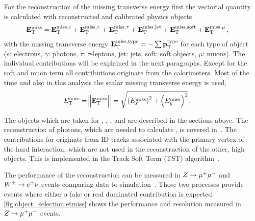 For the reconstruction of the missing transverse energy first the vectorial quantity \etmissvec{} is calculated
with reconstructed and calibrated physics objects~\cite{ATL-PHYS-PUB-2015-023}
\begin{equation}
    \label{eq:met:vector}
    \mathbf{E}_\text{T}^\text{miss} = \mathbf{E}_\text{T}^{\text{miss},e} + \mathbf{E}_\text{T}^{\text{miss},\gamma} + \mathbf{E}_\text{T}^{\text{miss},\tau} + \mathbf{E}_\text{T}^{\text{miss},\text{jet}} + \mathbf{E}_\text{T}^{\text{miss},\text{soft}} + \mathbf{E}_\text{T}^{\text{miss},\mu} \,,
\end{equation}
with the missing transverse energy $\mathbf{E}_\text{T}^{\text{miss},\text{type}} = - \sum \mathbf{p}_\text{T}^\text{type}$ for each type of object
($e$: electrons, $\gamma$: photons, $\tau$: $\tau$-leptons, jet: jets, soft: soft objects, $\mu$: muons).
The individual contributions will be explained in the next paragraphs.
Except for the soft and muon term all contributions originate from the calorimeters.
Most of the time and also in this analysis the scalar missing transverse energy \etmiss{} is used,
\begin{equation}
    \label{eq:met:scalar}
    E_\text{T}^\text{miss}{} = \norm{\mathbf{E}_\text{T}^\text{miss}{}} = \sqrt{{\left(E_x^\text{miss}\right)}^2 + {\left(E_y^\text{miss}\right)}^2} \,.
\end{equation}

The objects which are taken for , \etmissvecobj{\mu}, \etmissvecobj{\tau},
and  are described in the sections above.
The reconstruction of photons, which are needed to calculate \etmissvecobj{\gamma}, is covered in~\cite{PERF-2013-04}.
The contributions for  originate from  ID tracks associated with the primary vertex of the
hard interaction, which are not used in the reconstruction of the other, high \pt{} objects.
This is implemented in the Track Soft Term (TST) algorithm~\cite{ATL-PHYS-PUB-2015-023}.

The performance of the \etmiss{} reconstruction can be measured in $Z \to \mu^+\mu^-$ and $W^\pm \to e^\pm \nu$
events comparing data to simulation~\cite{ATL-PHYS-PUB-2015-027}.
Those two processes provide events where either a fake or real dominated \etmiss{} contribution is expected.
\cref{fig:object_selection:etmiss} shows the performance and resolution measured in $Z \to \mu^+\mu^-$ events.

